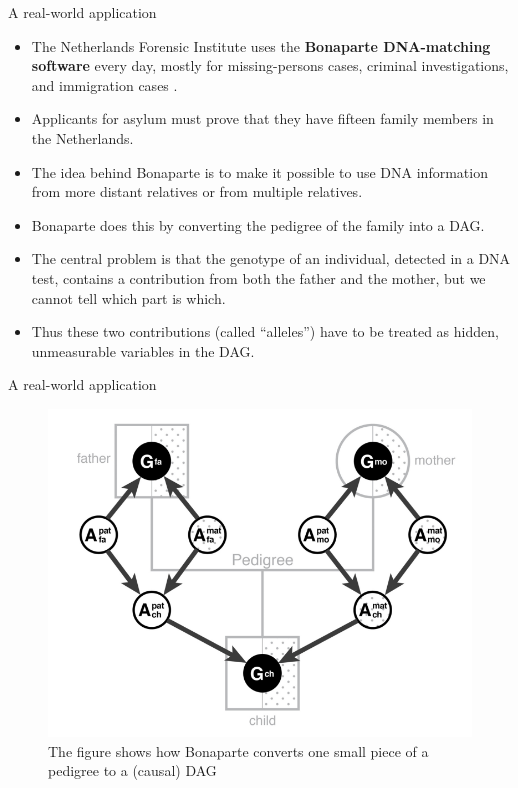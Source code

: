 \documentclass[handout]{beamer}
\begin{document}
\begin{frame}{A real-world application}
\scriptsize{
\begin{itemize}
\item  The Netherlands Forensic Institute uses the  \textbf{Bonaparte DNA-matching software}  every day, mostly for missing-persons cases, criminal investigations, and immigration cases \cite{pearl2018book}. 


\item Applicants for asylum must prove that they have fifteen family members in the Netherlands.

 \item The idea behind Bonaparte is to make it possible to use DNA information from more distant relatives or from multiple relatives.

  
\item Bonaparte does this by converting the pedigree of the family  into a DAG.

\item The central problem is that the genotype of an individual, detected in a DNA test, contains a contribution from both the father and the mother, but we cannot tell which part is which.


\item Thus these two contributions (called ``alleles'') have to be treated as hidden, unmeasurable variables in the DAG.




 
\end{itemize}



} 

\end{frame}


\begin{frame}{A real-world application}

\begin{figure}[h!]
	\centering
	\includegraphics[scale=0.3]{pics/bonaparte.png}
	\caption{The figure shows  how Bonaparte converts one small piece of a pedigree to a (causal) DAG \cite{pearl2018book}}
	\end{figure} 


\end{frame}
\end{document}
